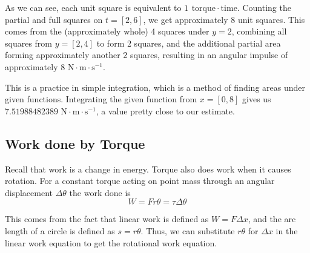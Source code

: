 \begin{Answer}[ref={ex:ang_imp}]
As we can see, each unit square is equivalent to $1 \,\ \mathrm{torque}\cdot \mathrm{time}$. Counting the partial and full squares on $t=[2,6]$, we get approximately 8 unit squares. This comes from the (approximately whole) 4 squares under $y=2$, combining all squares from $y=[2,4]$ to form 2 squares, and the additional partial area forming approximately another 2 squares, resulting in an angular impulse of approximately $8 \text{ N}\cdot \text{m} \cdot \text{s}^{-1}$. 

This is a practice in simple integration, which is a method of finding areas under given functions. Integrating the given function from $x=[0,8]$ gives us $7.51988482389 \text{ N}\cdot \text{m} \cdot \text{s}^{-1}$, a value pretty close to our estimate.
\end{Answer}
\subsection{Work done by Torque}
Recall that work is a change in energy. Torque also does work when it causes rotation. For a constant torque acting on point mass through an angular displacement $\Delta \theta$ the work done is
\begin{equation}
W = Fr\theta= \tau \Delta \theta
\label{eq:work_rot}
\end{equation}

This comes from the fact that linear work is defined as $W = F \Delta x$, and the arc length of a circle is defined as $s = r \theta$. Thus, we can substitute $r \theta$ for $\Delta x$ in the linear work equation to get the rotational work equation.

